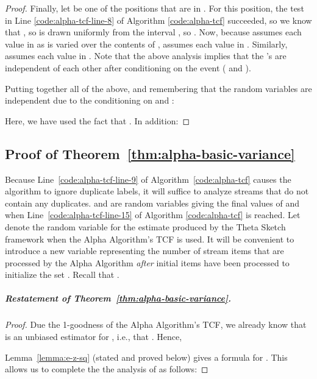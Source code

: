 \documentclass{article}
\begin{document}
\begin{proof}
Finally, let  be one of the  positions that are in . For this position,
the test in 
Line \ref{code:alpha-tcf-line-8} of Algorithm \ref{code:alpha-tcf}
succeeded, so we know that ,
so  is drawn uniformly from the interval , so
.
Now, because  assumes each value in  as
 is varied over the contents of ,  assumes each value in 
.
Similarly,  assumes each value in
. 
Note that the above analysis implies that the 's are independent of each other after conditioning on the 
event ( and ).

Putting together all of the above, and remembering that the random variables
 are independent due to the conditioning on  and :

Here, we have used the fact that .
In addition:

\end{proof}

\subsection{Proof of Theorem~\ref{thm:alpha-basic-variance}}\label{appendix-proof-of-alpha-basic-variance}



 Because Line~\ref{code:alpha-tcf-line-9} 
of Algorithm~\ref{code:alpha-tcf} causes the algorithm to ignore duplicate labels,
it will suffice to analyze streams that do not contain any duplicates.
 and  are random variables giving
the final values of  and  when Line~\ref{code:alpha-tcf-line-15} of Algorithm
\ref{code:alpha-tcf} is
reached. Let  denote the
random variable for the estimate produced by the Theta Sketch
framework when the Alpha Algorithm's TCF is used. 
It will be convenient to introduce a new variable 
representing the number of stream items that are processed by the 
Alpha Algorithm {\em after}  initial items have been processed to
initialize the set .  Recall that . 










\subparagraph*{Restatement of Theorem~\ref{thm:alpha-basic-variance}.}

\begin{proof}
Due the 1-goodness of the Alpha Algorithm's TCF, we already 
know that  is an unbiased estimator for , i.e., that . Hence,


Lemma~\ref{lemma:e-z-sq} (stated and proved below) gives a formula for . This allows us to complete the 
the analysis of  as follows:

\end{proof}
\end{document}
